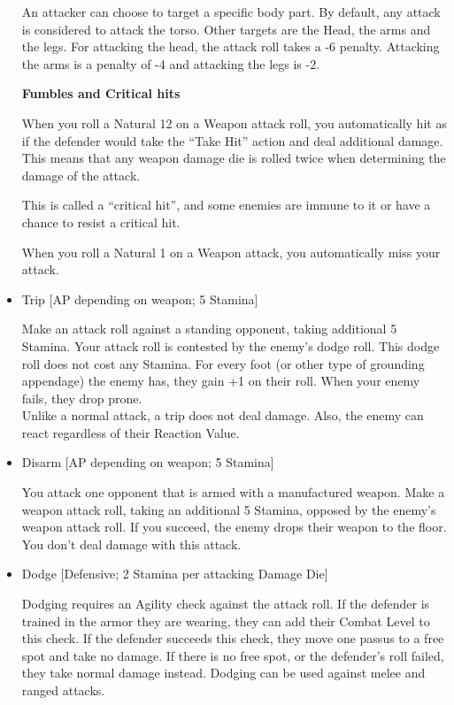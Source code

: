\begin{itemize}
An attacker can choose to target a specific body part. By default, any attack is considered to attack the torso. Other targets are the Head, the arms and the legs. For attacking the head, the attack roll takes a -6 penalty. Attacking the arms is a penalty of -4 and attacking the legs is -2.



\textbf{Fumbles and Critical hits}

When you roll a Natural 12 on a Weapon attack roll, you automatically hit as if the defender would take the “Take Hit” action and deal additional damage. This means that any weapon damage die is rolled twice when determining the damage of the attack.

This is called a “critical hit”, and some enemies are immune to it or have a chance to resist a critical hit.

When you roll a Natural 1 on a Weapon attack, you automatically miss your attack.



\item Trip [AP depending on weapon; 5 Stamina]

Make an attack roll against a standing opponent, taking additional 5 Stamina. Your attack roll is contested by the enemy's dodge roll. This dodge roll does not cost any Stamina. For every foot (or other type of grounding appendage) the enemy has, they gain +1 on their roll. When your enemy fails, they drop prone.\\
Unlike a normal attack, a trip does not deal damage. Also, the enemy can react regardless of their Reaction Value.\\



\item Disarm [AP depending on weapon; 5 Stamina]

You attack one opponent that is armed with a manufactured weapon. Make a weapon attack roll, taking an additional 5 Stamina, opposed by the enemy's weapon attack roll. If you succeed, the enemy drops their weapon to the floor. You don't deal damage with this attack.\\


\item Dodge [Defensive; 2 Stamina per attacking Damage Die]

Dodging requires an Agility check against the attack roll. If the defender is trained in the armor they are wearing, they can add their Combat Level to this check. If the defender succeeds this check, they move one passus to a free spot and take no damage. If there is no free spot, or the defender’s roll failed, they take normal damage instead. Dodging can be used against melee and ranged attacks.




\end{itemize}
